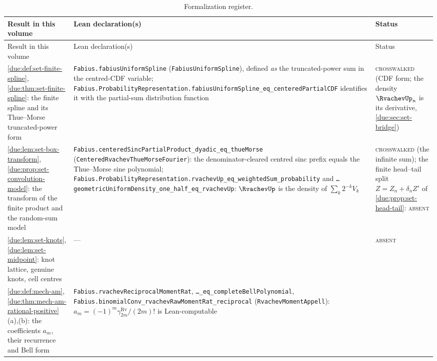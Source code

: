 \documentclass[11pt,oneside]{article}
\theoremstyle{plain}
\theoremstyle{definition}
\theoremstyle{remark}
\newcommand{\upn}[1]{\RvachevUp_{#1}}
\newcommand{\am}[1]{a_{#1}}                                 %
\begin{document}
\begin{center}
\small
\begin{longtable}{@{}>{\raggedright\arraybackslash}p{}>{\raggedright\arraybackslash}p{}>{\raggedright\arraybackslash}p{}@{}}
\caption{Formalization register.}
\label{due:tab:reg-lean}\\
\toprule
Result in this volume & Lean declaration(s) & Status\\
\midrule
\endfirsthead
\toprule
Result in this volume & Lean declaration(s) & Status\\
\midrule
\endhead
\cref{due:def:set-finite-spline}, \cref{due:thm:set-finite-spline}: the finite spline and its Thue--Morse truncated-power form
& \texttt{Fabius.\allowbreak fabiusUniformSpline} (\texttt{FabiusUniformSpline}), defined \emph{as} the truncated-power sum in the centred-CDF variable; \texttt{Fabius.ProbabilityRepresentation.\allowbreak fabiusUniformSpline\_eq\_centeredPartialCDF} identifies it with the partial-sum distribution function
& \textsc{crosswalked} (CDF form; the density $\upn{n}$ is its derivative, \cref{due:sec:set-bridge})\\[0.3em]
\cref{due:lem:set-box-transform}, \cref{due:prop:set-convolution-model}: the transform of the finite product and the random-sum model
& \texttt{Fabius.\allowbreak centeredSincPartialProduct\_\allowbreak dyadic\_\allowbreak eq\_\allowbreak thueMorse} (\texttt{CenteredRvachevThueMorseFourier}): the denominator-cleared centred sinc prefix equals the Thue--Morse sine polynomial; \texttt{Fabius.ProbabilityRepresentation.\allowbreak rvachevUp\_eq\_weightedSum\_probability} and \texttt{\ldots geometricUniformDensity\_\allowbreak one\_\allowbreak half\_\allowbreak eq\_\allowbreak rvachevUp}: $\RvachevUp$ is the density of $\sum_{k}2^{-k}V_{k}$
& \textsc{crosswalked} (the infinite sum); the finite head--tail split $Z=Z_{n}+\delta_{n}Z'$ of \cref{due:prop:set-head-tail}: \textsc{absent}\\[0.3em]
\cref{due:lem:set-knots}, \cref{due:lem:set-midpoint}: knot lattice, genuine knots, cell centres
& --- & \textsc{absent}\\[0.3em]
\cref{due:def:mech-am}, \cref{due:thm:mech-am-rational-positive}(a),(b): the coefficients $\am{m}$, their recurrence and Bell form
& \texttt{Fabius.\allowbreak rvachevReciprocalMomentRat}, \texttt{\ldots\_\allowbreak eq\_\allowbreak completeBellPolynomial}, \texttt{Fabius.\allowbreak binomialConv\_\allowbreak rvachevRawMomentRat\_\allowbreak reciprocal} (\texttt{RvachevMomentAppell}): $\am{m}=(-1)^{m}\gamma^{\mathrm{Rv}}_{2m}/(2m)!$ is Lean-computable

\end{longtable}
\end{center}
\end{document}
